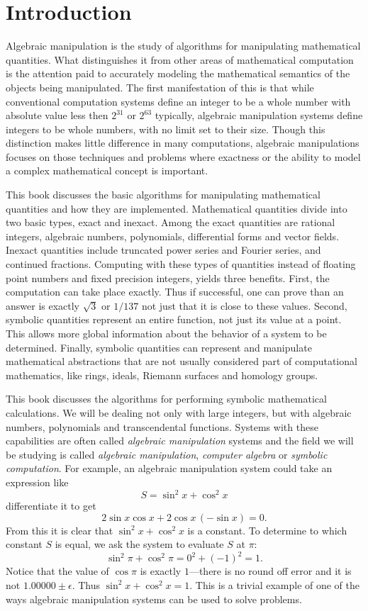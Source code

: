 \chapter{Introduction}

Algebraic manipulation is the study of algorithms for manipulating
mathematical quantities.  What distinguishes it from other areas of
mathematical computation is the attention paid to accurately modeling the
mathematical semantics of the objects being manipulated.  The first
manifestation of this is that while conventional computation systems define
an integer to be a whole number with absolute value less then $2^{31}$ or
$2^{63}$ typically, algebraic manipulation systems define integers to be
whole numbers, with no limit set to their size.  Though this distinction
makes little difference in many computations, algebraic manipulations
focuses on those techniques and problems where exactness or the ability to
model a complex mathematical concept is important.

This book discusses the basic algorithms for manipulating mathematical
quantities and how they are implemented.  Mathematical quantities divide
into two basic types, exact and inexact.  Among the exact quantities are
rational integers, algebraic numbers, polynomials, differential forms and
vector fields.  Inexact quantities include truncated power series and
Fourier series, and continued fractions.  Computing with these types of
quantities instead of floating point numbers and fixed precision integers,
yields three benefits.  First, the computation can take place exactly. Thus
if successful, one can prove than an answer is exactly $\sqrt{3}$ or
$1/137$ not just that it is close to these values.  Second, symbolic
quantities represent an entire function, not just its value at a point.
This allows more global information about the behavior of a system to be
determined.  Finally, symbolic quantities can represent and manipulate
mathematical abstractions that are not usually considered part of
computational mathematics, like rings, ideals, Riemann surfaces and
homology groups.

This book discusses the algorithms for performing symbolic
mathematical calculations.  We will be dealing not only with large
integers, but with algebraic numbers, polynomials and transcendental
functions.  Systems with these capabilities are often called {\em
algebraic manipulation} systems and the field we will be studying is
called {\em algebraic manipulation\/}, {\em computer algebra} or {\em
symbolic computation}.  For example, an algebraic manipulation system
could take an expression like
\[
S = \sin^2 x + \cos^2 x
\]
differentiate it to get
\[
2 \sin x \cos x + 2 \cos x \, (- \sin x) = 0.
\]
From this it is clear that $\sin^2 x + \cos^2 x$ is a constant.  To
determine to which constant $S$ is equal, we ask the system to evaluate $S$
at $\pi$:
\[
\sin^2 \pi + \cos^2 \pi = 0^2 + (-1)^2 = 1.
\]
Notice that the value of $\cos \pi$ is exactly $1$---there is no round
off error and it is not
$1.00000\pm\epsilon$. Thus $\sin^2 x + \cos^2 x = 1$.  This is a trivial
example of one of the ways algebraic manipulation systems can be used to
solve problems.

